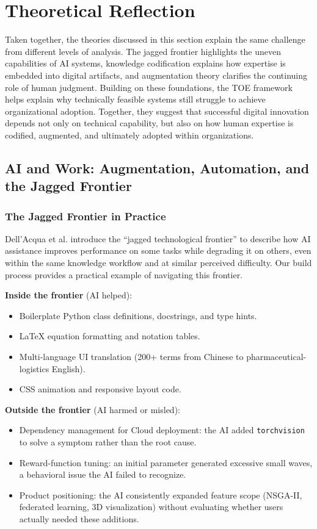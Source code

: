 \section{Theoretical Reflection}\label{sec:theory}

Taken together, the theories discussed in this section explain the same challenge from different levels of analysis. The jagged frontier highlights the uneven capabilities of AI systems, knowledge codification explains how expertise is embedded into digital artifacts, and augmentation theory clarifies the continuing role of human judgment. Building on these foundations, the TOE framework helps explain why technically feasible systems still struggle to achieve organizational adoption. Together, they suggest that successful digital innovation depends not only on technical capability, but also on how human expertise is codified, augmented, and ultimately adopted within organizations.

\subsection{AI and Work: Augmentation, Automation, and the Jagged Frontier}

\subsubsection{The Jagged Frontier in Practice}

Dell'Acqua et al.\parencite{DellAcqua2026} introduce the ``jagged technological frontier'' to describe how AI assistance improves performance on some tasks while degrading it on others, even within the same knowledge workflow and at similar perceived difficulty. Our build process provides a practical example of navigating this frontier.

\textbf{Inside the frontier} (AI helped):
\begin{itemize}
\item Boilerplate Python class definitions, docstrings, and type hints.
\item LaTeX equation formatting and notation tables.
\item Multi-language UI translation (200+ terms from Chinese to pharmaceutical-logistics English).
\item CSS animation and responsive layout code.
\end{itemize}

\textbf{Outside the frontier} (AI harmed or misled):
\begin{itemize}
\item Dependency management for Cloud deployment: the AI added \texttt{torchvision} to solve a symptom rather than the root cause.
\item Reward-function tuning: an initial parameter generated excessive small waves, a behavioral issue the AI failed to recognize.
\item Product positioning: the AI consistently expanded feature scope (NSGA-II, federated learning, 3D visualization) without evaluating whether users actually needed these additions.
\end{itemize}

